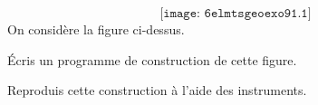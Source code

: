 \[\texttt{[image: 6elmtsgeoexo91.1]}\]
On considère la figure ci-dessus.
\begin{myenumerate}
\item \'Ecris un programme de construction de cette figure.
\item Reproduis cette construction à l'aide des instruments.
\end{myenumerate}
